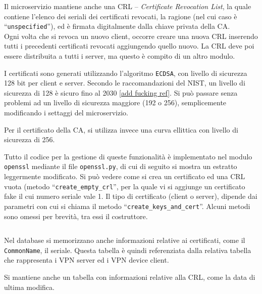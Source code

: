 Il microservizio mantiene anche una CRL -- \textit{Certificate Revocation List}, la quale
contiene l'elenco dei seriali dei certificati revocati, la ragione (nel cui caso è ``\texttt{unspecified}''),
ed è firmata digitalmente dalla chiave privata della CA.\\
Ogni volta che si revoca un nuovo client, occorre creare una nuova CRL inserendo tutti i
precedenti certificati revocati aggiungendo quello nuovo. La CRL deve poi essere distribuita 
a tutti i server, ma questo è compito di un altro modulo.

I certificati sono generati utilizzando l'algoritmo \texttt{ECDSA}, con livello di sicurezza
128 bit per client e server. Secondo le raccomandazioni del NIST, un livello di sicurezza di
128 è sicuro fino al 2030 \ref{add fucking ref}. Si può passare senza
problemi ad un livello di sicurezza maggiore (192 o 256), semplicemente modificando i settaggi
del microservizio.

Per il certificato della CA, si utilizza invece una curva ellittica con livello di sicurezza
di 256.


Tutto il codice per la gestione di queste funzionalità è implementato nel modulo \texttt{openssl}
mediante il file \texttt{openssl.py}, di cui di seguito si mostra un estratto leggermente
modificato.
Si può vedere come si crea un certificato ed una CRL vuota (metodo
``\texttt{create\_empty\_crl}'', per la quale vi
si aggiunge un certificato fake il cui numero seriale vale 1.
Il tipo di certificato (client o server), dipende dai parametri con cui si chiama il metodo
``\texttt{create\_keys\_and\_cert}''.
Alcuni metodi sono omessi per brevità, tra essi il costruttore.
\inputminted[tabsize=4]{python}{code_samples/openssl.py}


Nel database si memorizzano anche informazioni relative ai certificati, come il
\texttt{CommonName}, il seriale. Questa tabella è quindi referenziata dalla relativa
tabella che rappresenta i VPN server ed i VPN device client.

Si mantiene anche un tabella con informazioni relative alla CRL, come la data di ultima
modifica.


